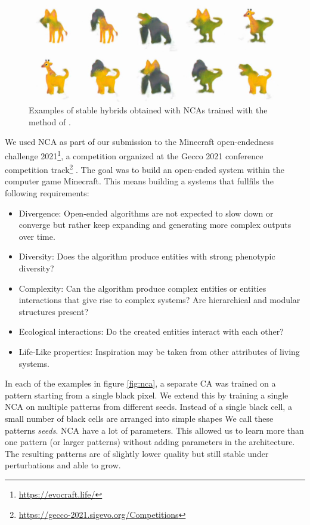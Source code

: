\begin{figure}[htbp]
  \centering
  \includegraphics[width=.8\linewidth]{figures/nca_hybrids.png}
  \caption{Examples of stable hybrids obtained with \acp{NCA} trained with the
    method of \parencite{cisnerosOpenendedCreationHybrid2021}.}
  \label{fig:nca_hybrid}
\end{figure}


We used \ac{NCA} as part of our submission to the Minecraft open-endedness
challenge 2021\footnote{\url{https://evocraft.life/}}, a competition organized
at the Gecco 2021 conference competition
track\footnote{\url{https://gecco-2021.sigevo.org/Competitions}}
\parencite{cisnerosOpenendedCreationHybrid2021}. The goal was to build an
open-ended system within the computer game Minecraft. This means building a
systems that fullfils the following requirements:

\begin{itemize}
  \item Divergence: Open-ended algorithms are not expected to slow down or
        converge but rather keep expanding and generating more complex outputs
        over time.

  \item Diversity: Does the algorithm produce entities with strong phenotypic
        diversity?

  \item Complexity: Can the algorithm produce complex entities or entities
        interactions that give rise to complex systems? Are hierarchical and
        modular structures present?

  \item Ecological interactions: Do the created entities interact with each
        other?

  \item Life-Like properties: Inspiration may be taken from other attributes of
        living systems.
\end{itemize}

In each of the examples in figure \ref{fig:nca}, a separate \ac{CA} was trained
on a pattern starting from a single black pixel. We extend this by training a
single \ac{NCA} on multiple patterns from different seeds. Instead of a single
black cell, a small number of black cells are arranged into simple shapes We
call these patterns \emph{seeds}. \ac{NCA} have a lot of parameters. This
allowed us to learn more than one pattern (or larger patterns) without adding
parameters in the architecture. The resulting patterns are of slightly lower
quality but still stable under perturbations and able to grow.

